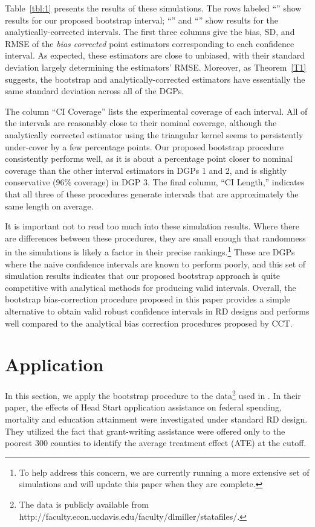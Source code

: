 \documentclass[12pt,fleqn]{article}
\begin{document}
Table~\ref{tbl:1} presents the results of these simulations. The rows labeled
``\bootuni'' show results for our proposed bootstrap interval; ``\cctuni'' and
``\ccttri'' show results for the analytically-corrected intervals. The first
three columns give the bias, SD, and RMSE of the \emph{bias corrected} point
estimators corresponding to each confidence interval.  As expected, these
estimators are close to unbiased, with their standard deviation largely
determining the estimators' RMSE. Moreover, as Theorem~\ref{T1} suggests, the
bootstrap and analytically-corrected estimators have essentially the same
standard deviation across all of the DGPs.

The column ``CI Coverage'' lists the experimental coverage of each interval.
All of the intervals are reasonably close to their nominal coverage, although
the analytically corrected estimator using the triangular kernel seems to
persistently under-cover by a few percentage points. Our proposed bootstrap
procedure consistently performs well, as it is about a percentage point closer
to nominal coverage than the other interval estimators in DGPs 1 and 2, and is
slightly conservative (96\% coverage) in DGP 3. The final column, ``CI Length,''
indicates that all three of these procedures generate intervals that are
approximately the same length on average.

It is important not to read too much into these simulation results. Where there
are differences between these procedures, they are small enough that randomness
in the simulations is likely a factor in their precise rankings.\footnote{%
  To help address this concern, we are currently running a more extensive set of
  simulations and will update this paper when they are complete.} %
These are DGPs where the naive confidence intervals are known to perform poorly,
and this set of simulation results indicates that our proposed bootstrap approach
is quite competitive with analytical methods for producing valid intervals.
Overall, the bootstrap bias-correction procedure proposed in this paper provides
a simple alternative to obtain valid robust confidence intervals in RD designs
and performs well compared to the analytical bias correction procedures proposed
by CCT.

\section{Application}\label{application}

In this section, we apply the bootstrap procedure to the data\footnote{The data is publicly available from http://faculty.econ.ucdavis.edu/faculty/dlmiller/statafiles/.} used in \cite{ludwig2007}. In their paper, the effects of Head Start application assistance on federal spending, mortality and education attainment were investigated under standard RD design. They utilized the fact that grant-writing assistance were offered only to the poorest 300 counties to identify the average treatment effect (ATE) at the cutoff.
\end{document}

